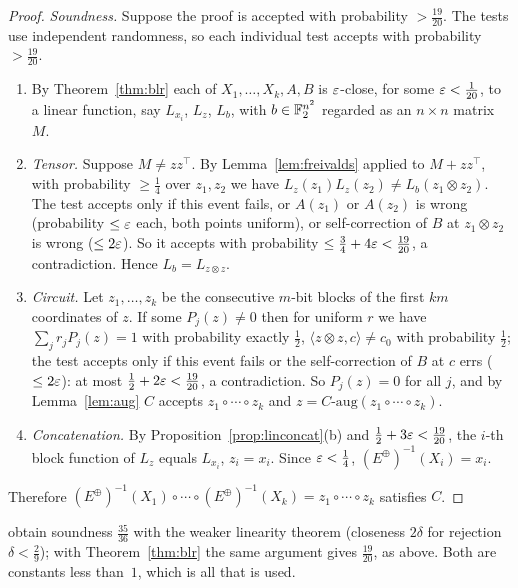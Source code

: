 \begin{proof}
\emph{Soundness.}  Suppose the proof is accepted with probability $>\tfrac{19}{20}$.  The tests use independent randomness, so each individual test accepts with probability $>\tfrac{19}{20}$.
\begin{enumerate}[label=(\roman*)]
  \item By Theorem~\ref{thm:blr} each of $X_1,\dots,X_k,A,B$ is $\varepsilon$-close, for some $\varepsilon<\tfrac1{20}$, to a linear function, say $L_{x_i}$, $L_z$, $L_b$, with $b\in\mathbb{F}_2^{n^2}$ regarded as an $n\times n$ matrix $M$.
  \item \emph{Tensor.}  Suppose $M\ne zz^\top$.  By Lemma~\ref{lem:freivalds} applied to $M+zz^\top$, with probability $\ge\tfrac14$ over $z_1,z_2$ we have $L_z(z_1)L_z(z_2)\ne L_b(z_1\otimes z_2)$.  The test accepts only if this event fails, or $A(z_1)$ or $A(z_2)$ is wrong (probability $\le\varepsilon$ each, both points uniform), or self-correction of $B$ at $z_1\otimes z_2$ is wrong ($\le2\varepsilon$).  So it accepts with probability $\le\tfrac34+4\varepsilon<\tfrac{19}{20}$, a contradiction.  Hence $L_b=L_{z\otimes z}$.
  \item \emph{Circuit.}  Let $z_1,\dots,z_k$ be the consecutive $m$-bit blocks of the first $km$ coordinates of $z$.  If some $P_j(z)\ne0$ then for uniform $r$ we have $\sum_jr_jP_j(z)=1$ with probability exactly $\tfrac12$, \ie $\langle z\otimes z,c\rangle\ne c_0$ with probability $\tfrac12$; the test accepts only if this event fails or the self-correction of $B$ at $c$ errs ($\le2\varepsilon$): at most $\tfrac12+2\varepsilon<\tfrac{19}{20}$, a contradiction.  So $P_j(z)=0$ for all $j$, and by Lemma~\ref{lem:aug} $C$ accepts $z_1\circ\cdots\circ z_k$ and $z=C\text{-aug}(z_1\circ\cdots\circ z_k)$.
  \item \emph{Concatenation.}  By Proposition~\ref{prop:linconcat}(b) and $\tfrac12+3\varepsilon<\tfrac{19}{20}$, the $i$-th block function of $L_z$ equals $L_{x_i}$, \ie $z_i=x_i$.  Since $\varepsilon<\tfrac14$, $(E^\oplus)^{-1}(X_i)=x_i$.
\end{enumerate}
Therefore $(E^\oplus)^{-1}(X_1)\circ\cdots\circ(E^\oplus)^{-1}(X_k)=z_1\circ\cdots\circ z_k$ satisfies $C$.
\end{proof}

\begin{remark}
\citet{ALMSS98} obtain soundness $\tfrac{35}{36}$ with the weaker linearity theorem (closeness $2\delta$ for rejection $\delta<\tfrac29$); with Theorem~\ref{thm:blr} the same argument gives $\tfrac{19}{20}$, as above.  Both are constants less than~$1$, which is all that is used.
\end{remark}

